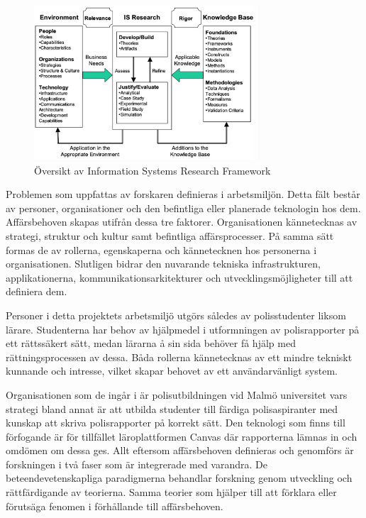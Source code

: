 \documentclass[swedish]{maucsthesis}
\begin{document}
\begin{figure}[H]
    \centering
    \includegraphics[width=0.75\textwidth]{isframework}
    \caption{Översikt av Information Systems Research Framework}
    \label{fig:isframework}
\end{figure}

Problemen som uppfattas av forskaren definieras i arbetsmiljön. Detta fält
består av personer, organisationer och den befintliga eller planerade teknologin
hos dem. Affärsbehoven skapas utifrån dessa tre faktorer. Organisationen
kännetecknas av strategi, struktur och kultur samt befintliga affärsprocesser.
På samma sätt formas de av rollerna, egenskaperna och kännetecknen hos
personerna i organisationen. Slutligen bidrar den nuvarande tekniska
infrastrukturen, applikationerna, kommunikationsarkitekturer och
utvecklingsmöjligheter till att definiera dem.

Personer i detta projektets arbetsmiljö utgörs således av polisstudenter liksom
lärare. Studenterna har behov av hjälpmedel i utformningen av polisrapporter på
ett rättssäkert sätt, medan lärarna å sin sida behöver få hjälp med
rättningsprocessen av dessa. Båda rollerna kännetecknas av ett mindre tekniskt
kunnande och intresse, vilket skapar behovet av ett användarvänligt system.

Organisationen som de ingår i är polisutbildningen vid Malmö universitet vars
strategi bland annat är att utbilda studenter till färdiga polisaspiranter med
kunskap att skriva polisrapporter på korrekt sätt. Den teknologi som finns till
förfogande är för tillfället läroplattformen Canvas där rapporterna lämnas in
och omdömen om dessa ges. Allt eftersom affärsbehoven definieras och genomförs är
forskningen i två faser som är integrerade med varandra. De
beteendevetenskapliga paradigmerna behandlar forskning genom utveckling och
rättfärdigande av teorierna. Samma teorier som hjälper till att förklara eller
förutsäga fenomen i förhållande till affärsbehoven.
\end{document}

